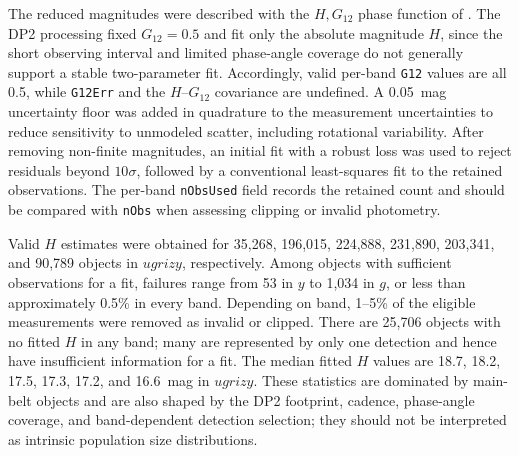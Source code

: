 The reduced magnitudes were described with the $H,G_{12}$ phase function of \citet[][]{2010Icar..209..542M}.
The \gls{DP2} processing fixed $G_{12}=0.5$ and fit only the absolute magnitude $H$, since the short observing interval and limited phase-angle coverage do not generally support a stable two-parameter fit.
Accordingly, valid per-band \texttt{G12} values are all 0.5, while \texttt{G12Err} and the $H$--$G_{12}$ covariance are undefined.
A 0.05~mag uncertainty floor was added in quadrature to the measurement uncertainties to reduce sensitivity to unmodeled scatter, including rotational variability.
After removing non-finite magnitudes, an initial fit with a robust loss was used to reject residuals beyond $10\sigma$, followed by a conventional least-squares fit to the retained observations.
The per-band \texttt{nObsUsed} field records the retained count and should be compared with \texttt{nObs} when assessing clipping or invalid photometry.

Valid $H$ estimates were obtained for 35,268, 196,015, 224,888, 231,890,
203,341, and 90,789 objects in $ugrizy$, respectively.
Among objects with sufficient observations for a fit, failures range from 53 in $y$ to 1,034 in $g$, or less than approximately 0.5\% in every band.
Depending on band, 1--5\% of the eligible measurements were removed as invalid or clipped.
There are 25,706 objects with no fitted $H$ in any band; many are represented by only one detection and hence have insufficient information for a fit.
The median fitted $H$ values are 18.7, 18.2, 17.5, 17.3, 17.2, and 16.6~mag in $ugrizy$.
These statistics are dominated by main-belt objects and are also shaped by the DP2 \gls{footprint}, \gls{cadence}, phase-angle coverage, and band-dependent detection selection; they should not be interpreted as intrinsic population size distributions.
